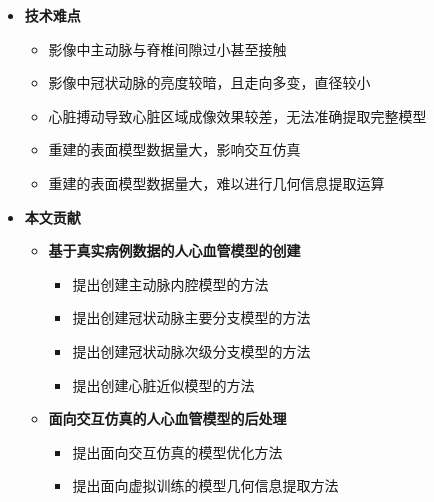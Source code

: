 \begin{frame}
\begin{itemize}
\item \textbf{技术难点}
\begin{itemize}
\pause \item 影像中主动脉与脊椎间隙过小甚至接触
\pause \item 影像中冠状动脉的亮度较暗，且走向多变，直径较小
\pause \item 心脏搏动导致心脏区域成像效果较差，无法准确提取完整模型
\pause \item 重建的表面模型数据量大，影响交互仿真
\pause \item 重建的表面模型数据量大，难以进行几何信息提取运算
\end{itemize}
\end{itemize}
\end{frame}

\begin{frame}
\begin{itemize}
  \item \textbf{本文贡献}
  \begin{itemize}
     \item \textbf{基于真实病例数据的人心血管模型的创建}
    \begin{itemize}
       \item 提出创建主动脉内腔模型的方法
       \item 提出创建冠状动脉主要分支模型的方法
       \item 提出创建冠状动脉次级分支模型的方法
       \item 提出创建心脏近似模型的方法
    \end{itemize}
     \item \textbf{面向交互仿真的人心血管模型的后处理}
    \begin{itemize}
       \item 提出面向交互仿真的模型优化方法
       \item 提出面向虚拟训练的模型几何信息提取方法
    \end{itemize}
  \end{itemize}
\end{itemize}
\end{frame} 